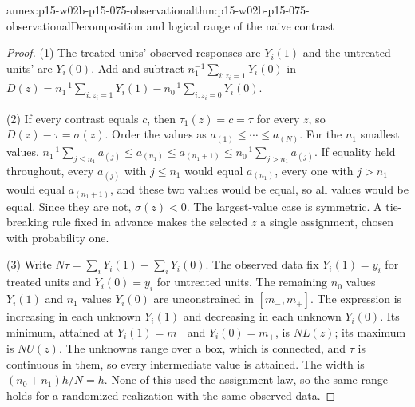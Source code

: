\begin{annexitem}{annex:p15-w02b-p15-075-observational}{thm:p15-w02b-p15-075-observational}{Decomposition and logical range of the naive contrast}
\begin{proof}
(1) The treated units' observed responses are \(Y_i(1)\) and the untreated
units' are \(Y_i(0)\). Add and subtract \(n_1^{-1}\sum_{i:z_i=1}Y_i(0)\) in
\(D(z)=n_1^{-1}\sum_{i:z_i=1}Y_i(1)-n_0^{-1}\sum_{i:z_i=0}Y_i(0)\).

(2) If every contrast equals \(c\), then \(\tau_1(z)=c=\tau\) for every \(z\),
so \(D(z)-\tau=\sigma(z)\). Order the values as
\(a_{(1)}\leq\cdots\leq a_{(N)}\). For the \(n_1\) smallest values,
\(n_1^{-1}\sum_{j\leq n_1}a_{(j)}\leq a_{(n_1)}\leq a_{(n_1+1)}\leq
n_0^{-1}\sum_{j>n_1}a_{(j)}\). If equality held throughout, every
\(a_{(j)}\) with \(j\leq n_1\) would equal \(a_{(n_1)}\), every one with
\(j>n_1\) would equal \(a_{(n_1+1)}\), and these two values would be equal, so
all values would be equal. Since they are not, \(\sigma(z)<0\). The
largest-value case is symmetric. A tie-breaking rule fixed in advance makes the
selected \(z\) a single assignment, chosen with probability one.

(3) Write \(N\tau=\sum_iY_i(1)-\sum_iY_i(0)\). The observed data fix \(Y_i(1)=y_i\)
for treated units and \(Y_i(0)=y_i\) for untreated units. The remaining
\(n_0\) values \(Y_i(1)\) and \(n_1\) values \(Y_i(0)\) are unconstrained in
\([m_-,m_+]\). The expression is increasing in each unknown \(Y_i(1)\) and
decreasing in each unknown \(Y_i(0)\). Its minimum, attained at
\(Y_i(1)=m_-\) and \(Y_i(0)=m_+\), is \(NL(z)\); its maximum is \(NU(z)\).
The unknowns range over a box, which is connected, and \(\tau\) is continuous
in them, so every intermediate value is attained. The width is
\((n_0+n_1)h/N=h\). None of this used the assignment law, so the same range
holds for a randomized realization with the same observed data.
\end{proof}
\end{annexitem}

